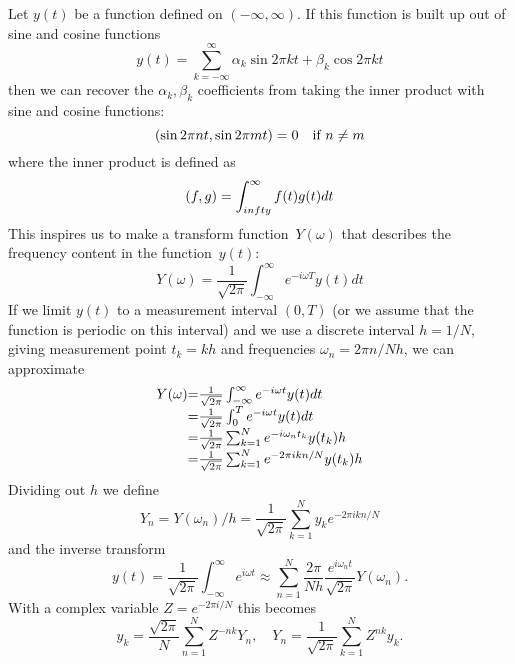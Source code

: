 Let $y(t)$ be a function defined on $(-\infty,\infty)$. If this
function is built up out of sine and cosine functions
\[ y(t) = \sum_{k=-\infty}^\infty \alpha_k \sin 2\pi kt
                + \beta_k \cos 2\pi kt
\] 
then we can recover the $\alpha_k,\beta_k$ coefficients from taking
the inner product with sine and cosine functions:
\[ (\sin 2\pi nt,\sin 2\pi mt)=0 \quad \hbox{if $n\not=m$} \]
where the inner product is defined as
\[ (f,g) = \int_{\-infty}^\infty f(t)g(t)dt \]
This inspires us to make a transform function~$Y(\omega)$ that
describes the frequency content in the function~$y(t)$:
\[ Y(\omega) = \frac 1{\sqrt{2\pi}}
    \int_{-\infty}^\infty e^{-i\omega T} y(t) dt
\]
If we limit $y(t)$ to a measurement interval $(0,T)$ (or we assume
that the function is periodic on this interval) and we use a discrete
interval $h=1/N$, giving measurement point $t_k=kh$ and frequencies
$\omega_n = 2\pi n/Nh$,
we can approximate
\[ 
\begin{array}{r@{=}l}
  Y(\omega) 
  & \frac 1{\sqrt{2\pi}} \int_{-\infty}^\infty e^{-i\omega t} y(t) dt\\
  & \frac 1{\sqrt{2\pi}} \int_0^T e^{-i\omega t} y(t) dt\\
  & \frac 1{\sqrt{2\pi}} \sum_{k=1}^N  e^{-i\omega_nt_k} y(t_k) h\\
  & \frac 1{\sqrt{2\pi}} \sum_{k=1}^N  e^{-2\pi ikn/N} y(t_k) h\\
\end{array}
\]
Dividing out $h$ we define
\[ Y_n = Y(\omega_n)/h = \frac1{\sqrt{2\pi}} 
        \sum_{k=1}^N y_k e^{-2\pi ikn/N}
\]
and the inverse transform
\[ y(t) = \frac1{\sqrt{2\pi}} \int_{-\infty}^\infty e^{i\omega t}
    \approx \sum_{n=1}^N \frac{2\pi}{Nh} \frac{e^{i\omega_n
        t}}{\sqrt{2\pi}}
    Y(\omega_n).
\]
With a complex variable $Z=e^{-2\pi i/N}$ this becomes
\[ y_k = \frac{\sqrt{2\pi}}N \sum_{n=1}^N Z^{-nk} Y_n, \quad
    Y_n = \frac1{\sqrt{2\pi}} \sum_{k=1}^N Z^{nk} y_k.
\]

